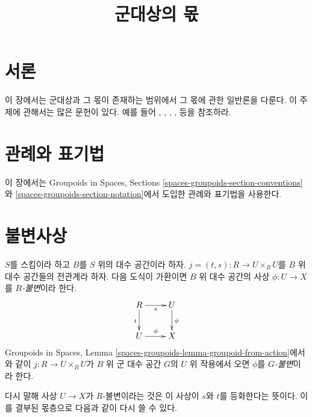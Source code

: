 

%


\title{군대상의 몫}


\maketitle

\label{section-phantom}

\tableofcontents

\section{서론}
\label{section-introduction}

\noindent
이 장에서는 군대상과 그 몫이 존재하는 범위에서 그 몫에 관한 일반론을
다룬다. 이 주제에 관해서는 많은 문헌이 있다. 예를 들어
\cite{GIT}, \cite{seshadri_quotients}, \cite{KollarQuotients},
\cite{K-M}, \cite{KollarFinite} 등을 참조하라.





\section{관례와 표기법}
\label{section-conventions-notation}

\noindent
이 장에서는 Groupoids in Spaces, Sections
\ref{spaces-groupoids-section-conventions}와
\ref{spaces-groupoids-section-notation}에서 도입한 관례와 표기법을 사용한다.


\section{불변사상}
\label{section-invariant}

\begin{definition}
\label{definition-invariant}
$S$를 스킴이라 하고 $B$를 $S$ 위의 대수 공간이라 하자.
$j = (t, s) : R \to U \times_B U$를 $B$ 위 대수 공간들의 전관계라 하자.
다음 도식이 가환이면 $B$ 위 대수 공간의 사상
$\phi : U \to X$를 {\it $R$-불변}이라 한다.
$$
\xymatrix{
R \ar[r]_s \ar[d]_t & U \ar[d]^\phi \\
U \ar[r]^\phi & X
}
$$
Groupoids in Spaces, Lemma
\ref{spaces-groupoids-lemma-groupoid-from-action}에서와 같이
$j : R \to U \times_B U$가 $B$ 위 군 대수 공간 $G$의 $U$ 위 작용에서
오면 $\phi$를 {\it $G$-불변}이라 한다.
\end{definition}

\noindent
다시 말해 사상 $U \to X$가 $R$-불변이라는 것은 이 사상이 $s$와 $t$를
등화한다는 뜻이다. 이를 결부된 몫층으로 다음과 같이 다시 쓸 수 있다.


